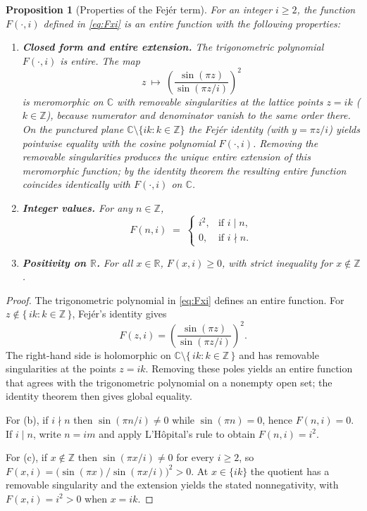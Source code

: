 \documentclass[11pt,a4paper]{amsart}
\theoremstyle{plain}
\newtheorem{proposition}[theorem]{Proposition}
\theoremstyle{definition}
\theoremstyle{remark}
\begin{document}
\begin{proposition}[Properties of the Fejér term]\label{prop:fejer-properties}
For an integer $i \ge 2$, the function $F(\cdot,i)$ defined in \eqref{eq:Fxi} is an entire function with the following properties:
\begin{enumerate}
    \item[(a)] \textbf{Closed form and entire extension.} The trigonometric polynomial $F(\cdot,i)$ is entire. The map
    \[
    z\ \longmapsto\ \left(\frac{\sin(\pi z)}{\sin(\pi z/i)}\right)^{\!2}
    \]
    is meromorphic on $\mathbb{C}$ with removable singularities at the lattice points $z=ik$ ($k\in\mathbb{Z}$), because numerator and denominator vanish to the same order there. On the punctured plane $\mathbb{C}\setminus\{ik:k\in\mathbb{Z}\}$ the Fejér identity (with $y=\pi z/i$) yields pointwise equality with the cosine polynomial $F(\cdot,i)$. Removing the removable singularities produces the unique entire extension of this meromorphic function; by the identity theorem the resulting entire function coincides identically with $F(\cdot,i)$ on $\mathbb{C}$.
    \item[(b)] \textbf{Integer values.} For any $n \in \mathbb{Z}$,
    \[
    F(n,i) \;=\; \begin{cases} i^2, & \text{if } i \mid n, \\ 0, & \text{if } i \nmid n. \end{cases}
    \]
    \item[(c)] \textbf{Positivity on $\mathbb{R}$.} For all $x\in\mathbb{R}$, $F(x,i) \ge 0$, with strict inequality for $x\notin\mathbb{Z}$.
\end{enumerate}
\end{proposition}

\begin{proof}
The trigonometric polynomial in \eqref{eq:Fxi} defines an entire function. For $z \notin \{\,i k: k\in\mathbb{Z}\,\}$, Fejér's identity gives
\[
F(z,i)=\left(\frac{\sin(\pi z)}{\sin(\pi z/i)}\right)^{\!2}.
\]
The right-hand side is holomorphic on $\mathbb{C}\setminus\{\,i k: k\in\mathbb{Z}\,\}$ and has removable singularities at the points $z=i k$. Removing these poles yields an entire function that agrees with the trigonometric polynomial on a nonempty open set; the identity theorem then gives global equality.

For (b), if $i \nmid n$ then $\sin(\pi n/i)\ne 0$ while $\sin(\pi n)=0$, hence $F(n,i)=0$. If $i \mid n$, write $n=i m$ and apply L’Hôpital's rule to obtain $F(n,i)=i^2$.

For (c), if $x\notin\mathbb{Z}$ then $\sin(\pi x/i)\ne 0$ for every $i\ge 2$, so $F(x,i)=\bigl(\sin(\pi x)/\sin(\pi x/i)\bigr)^2>0$. At $x\in\{i k\}$ the quotient has a removable singularity and the extension yields the stated nonnegativity, with $F(x,i)=i^2>0$ when $x=i k$.
\end{proof}
\end{document}
